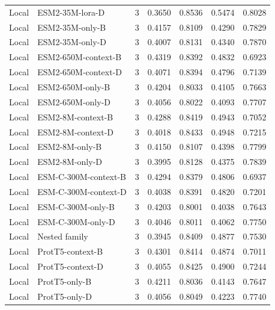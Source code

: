 \begin{longtable}{@{}P{1.35cm}P{5.3cm}rrrrr@{}}
Local & ESM2-\allowbreak{}35M-\allowbreak{}lora-\allowbreak{}D & 3 & 0.3650 & 0.8536 & 0.5474 & 0.8028 \\
Local & ESM2-\allowbreak{}35M-\allowbreak{}only-\allowbreak{}B & 3 & 0.4157 & 0.8109 & 0.4290 & 0.7829 \\
Local & ESM2-\allowbreak{}35M-\allowbreak{}only-\allowbreak{}D & 3 & 0.4007 & 0.8131 & 0.4340 & 0.7870 \\
Local & ESM2-\allowbreak{}650M-\allowbreak{}context-\allowbreak{}B & 3 & 0.4319 & 0.8392 & 0.4832 & 0.6923 \\
Local & ESM2-\allowbreak{}650M-\allowbreak{}context-\allowbreak{}D & 3 & 0.4071 & 0.8394 & 0.4796 & 0.7139 \\
Local & ESM2-\allowbreak{}650M-\allowbreak{}only-\allowbreak{}B & 3 & 0.4204 & 0.8033 & 0.4105 & 0.7663 \\
Local & ESM2-\allowbreak{}650M-\allowbreak{}only-\allowbreak{}D & 3 & 0.4056 & 0.8022 & 0.4093 & 0.7707 \\
Local & ESM2-\allowbreak{}8M-\allowbreak{}context-\allowbreak{}B & 3 & 0.4288 & 0.8419 & 0.4943 & 0.7052 \\
Local & ESM2-\allowbreak{}8M-\allowbreak{}context-\allowbreak{}D & 3 & 0.4018 & 0.8433 & 0.4948 & 0.7215 \\
Local & ESM2-\allowbreak{}8M-\allowbreak{}only-\allowbreak{}B & 3 & 0.4150 & 0.8107 & 0.4398 & 0.7799 \\
Local & ESM2-\allowbreak{}8M-\allowbreak{}only-\allowbreak{}D & 3 & 0.3995 & 0.8128 & 0.4375 & 0.7839 \\
Local & ESM-\allowbreak{}C-\allowbreak{}300M-\allowbreak{}context-\allowbreak{}B & 3 & 0.4294 & 0.8379 & 0.4806 & 0.6937 \\
Local & ESM-\allowbreak{}C-\allowbreak{}300M-\allowbreak{}context-\allowbreak{}D & 3 & 0.4038 & 0.8391 & 0.4820 & 0.7201 \\
Local & ESM-\allowbreak{}C-\allowbreak{}300M-\allowbreak{}only-\allowbreak{}B & 3 & 0.4203 & 0.8001 & 0.4038 & 0.7643 \\
Local & ESM-\allowbreak{}C-\allowbreak{}300M-\allowbreak{}only-\allowbreak{}D & 3 & 0.4046 & 0.8011 & 0.4062 & 0.7750 \\
Local & Nested family & 3 & 0.3945 & 0.8409 & 0.4877 & 0.7530 \\
Local & ProtT5-\allowbreak{}context-\allowbreak{}B & 3 & 0.4301 & 0.8414 & 0.4874 & 0.7011 \\
Local & ProtT5-\allowbreak{}context-\allowbreak{}D & 3 & 0.4055 & 0.8425 & 0.4900 & 0.7244 \\
Local & ProtT5-\allowbreak{}only-\allowbreak{}B & 3 & 0.4211 & 0.8036 & 0.4143 & 0.7647 \\
Local & ProtT5-\allowbreak{}only-\allowbreak{}D & 3 & 0.4056 & 0.8049 & 0.4223 & 0.7740 \\
\end{longtable}\endgroup
